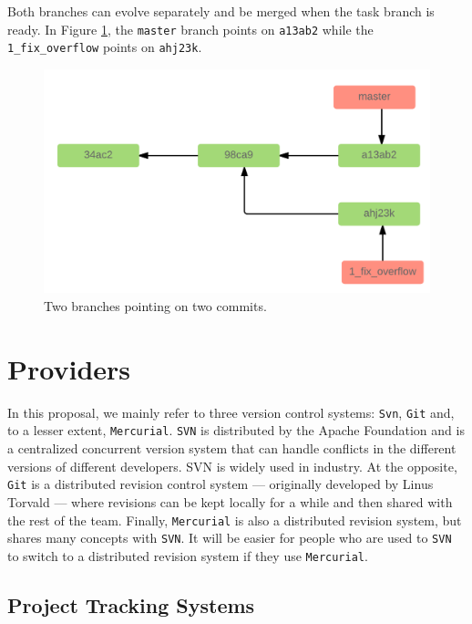 \documentclass[12pt]{report}
\begin{document}
Both branches can evolve separately and be merged when the task branch
is ready. In Figure \ref{fig:merge}, the \lstinline!master! branch
points on \lstinline!a13ab2! while the \lstinline!1_fix_overflow! points
on \lstinline!ahj23k!.

\begin{figure}[h!]
  \centering
    \includegraphics[scale=0.25]{media/merge.png}
    \caption{Two branches pointing on two commits.
    \label{fig:merge}}
\end{figure}

\section{\texorpdfstring{Providers\label{sec:revision-provider}}{Providers}}\label{providers}

In this proposal, we mainly refer to three version control systems:
\lstinline!Svn!, \lstinline!Git! and, to a lesser extent,
\lstinline!Mercurial!. \lstinline!SVN! is distributed by the Apache
Foundation and is a centralized concurrent version system that can
handle conflicts in the different versions of different developers. SVN
is widely used in industry. At the opposite, \lstinline!Git! is a
distributed revision control system --- originally developed by Linus
Torvald --- where revisions can be kept locally for a while and then
shared with the rest of the team. Finally, \lstinline!Mercurial! is also
a distributed revision system, but shares many concepts with
\lstinline!SVN!. It will be easier for people who are used to
\lstinline!SVN! to switch to a distributed revision system if they use
\lstinline!Mercurial!.

\subsection{Project Tracking Systems\label{sec:issue-tracking}}
\end{document}
